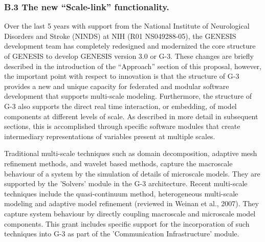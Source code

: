 \documentclass[12pt]{article}
\begin{document}
\subsubsection*{B.3 The new ``Scale-link'' functionality.}

\noindent Over the last 5 years with support from the National
Institute of Neurological Disorders and Stroke (NINDS) at NIH (R01
NS049288-05), the GENESIS development team has completely redesigned
and modernized the core structure of GENESIS to develop GENESIS
version 3.0 or G-3. These changes are briefly described in the
introduction of the ``Approach'' section of this proposal, however,
the important point with respect to innovation is that the structure
of G-3 provides a new and unique capacity for federated and modular
software development that supports multi-scale modeling. Furthermore,
the structure of G-3 also supports the direct real time interaction,
or embedding, of model components at different levels of scale.  As
described in more detail in subsequent sections, this is accomplished
through specific software modules that create intermediary
representations of variables present at multiple scales.

Traditional multi-scale techniques such as 
domain decomposition, adaptive mesh refinement methods, and wavelet
based methods, capture the macroscale behaviour of a system by the
simulation of details of microscale models.  They are supported by the
'Solvers' module in the G-3 architecture.  Recent multi-scale
techniques include the quasi-continuum method, heterogeneous
multi-scale modeling and adaptive model refinement (reviewed in Weinan
et al., 2007).  They capture system behaviour by directly coupling
macroscale and microscale model components.  This grant includes
specific support for the incorporation of such techniques into G-3 as
part of the 'Communication Infrastructure' module.


\end{document}
